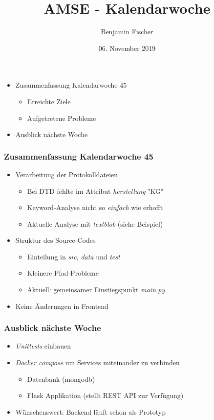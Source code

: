 \documentclass{beamer}
\title{AMSE - Kalendarwoche \cw{}}
\date{06. November 2019}
\author{Benjamin Fischer}
\institute{benjamin.f.fischer@fau.de}
\newcommand{\cw}{45}
\begin{document}
  \maketitle

  \begin{frame}
    \begin{itemize}
      \item Zusammenfassung Kalendarwoche \cw{}
      \begin{itemize}
        \item Erreichte Ziele
        \item Aufgetretene Probleme
      \end{itemize}
      \item Ausblick nächste Woche
    \end{itemize}
  \end{frame}

  \begin{frame}
    \frametitle{Zusammenfassung Kalendarwoche \cw{}}
    \begin{itemize}
      \item Verarbeitung der Protokolldateien
      \begin{itemize}
        \item Bei DTD fehlte im Attribut \textit{herstellung} "KG"
        \item Keyword-Analyse nicht so \textit{einfach} wie erhofft
        \item Aktuelle Analyse mit \textit{textblob} (siehe Beispiel)
      \end{itemize}
      \item Struktur des Source-Codes
      \begin{itemize}
        \item Einteilung in \textit{src}, \textit{data} und \textit{test}
        \item Kleinere Pfad-Probleme
        \item Aktuell: gemeinsamer Einstiegspunkt \textit{main.py}
      \end{itemize}
      \item Keine Änderungen in Frontend
    \end{itemize}
  \end{frame}

  \begin{frame}
    \frametitle{Ausblick nächste Woche}
    \begin{itemize}
      \item \textit{Unittests} einbauen
      \item \textit{Docker compose} um Services miteinander zu verbinden
      \begin{itemize}
        \item Datenbank (mongodb)
        \item Flask Applikation (stellt REST API zur Verfügung)
      \end{itemize}
      \item Wünschenswert: Backend läuft schon als Prototyp
    \end{itemize}
  \end{frame}
\end{document}
